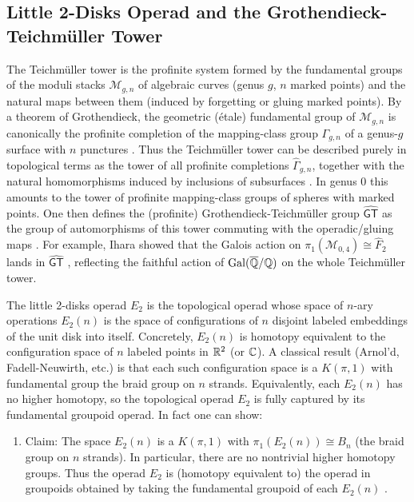 \subsection{Little 2-Disks Operad and the Grothendieck-Teichm\"uller Tower}

The Teichm\"uller tower is the profinite system formed by the fundamental groups of the moduli stacks $\mathcal{M}_{g,n}$ of algebraic curves (genus $g$, $n$ marked points) and the natural maps between them (induced by forgetting or gluing marked points).  By a theorem of Grothendieck, the geometric (\'etale) fundamental group of $\mathcal{M}_{g,n}$ is canonically the profinite completion of the mapping-class group $\Gamma_{g,n}$ of a genus-$g$ surface with $n$ punctures \cite{de_brito_operads_2019}. Thus the Teichm\"uller tower can be described purely in topological terms as the tower of all profinite completions $\widehat\Gamma_{g,n}$, together with the natural homomorphisms induced by inclusions of subsurfaces \cite{borghi_lecture_2025}. In genus 0 this amounts to the tower of profinite mapping-class groups of spheres with marked points.  One then defines the (profinite) Grothendieck-Teichm\"uller group $\widehat{\mathsf{GT}}$ as the group of automorphisms of this tower commuting with the operadic/gluing maps \cite{de_brito_operads_2019}. For example, Ihara showed that the Galois action on $\pi_1(\mathcal{M}_{0,4})\cong\widehat F_2$ lands in $\widehat{\mathsf{GT}}$ \cite{de_brito_operads_2019}, reflecting the faithful action of $\mathrm{Gal}(\overline{\mathbb{Q}}/\mathbb{Q})$ on the whole Teichm\"uller tower.

The little 2-disks operad $E_2$ is the topological operad whose space of $n$-ary operations $E_2(n)$ is the space of configurations of $n$ disjoint labeled embeddings of the unit disk into itself.  Concretely, $E_2(n)$ is homotopy equivalent to the configuration space of $n$ labeled points in $\mathbb{R}^2$ (or $\mathbb{C}$).  A classical result (Arnol'd, Fadell-Neuwirth, etc.) is that each such configuration space is a $K(\pi,1)$ with fundamental group the braid group on $n$ strands.  Equivalently, each $E_2(n)$ has no higher homotopy, so the topological operad $E_2$ is fully captured by its fundamental groupoid operad.  In fact one can show:

\begin{enumerate}
    \item Claim: The space $E_2(n)$ is a $K(\pi,1)$ with $\pi_1(E_2(n))\cong B_n$ (the braid group on $n$ strands).  In particular, there are no nontrivial higher homotopy groups.  Thus the operad $E_2$ is (homotopy equivalent to) the operad in groupoids obtained by taking the fundamental groupoid of each $E_2(n)$ \cite{C_2014}.
\end{enumerate}

